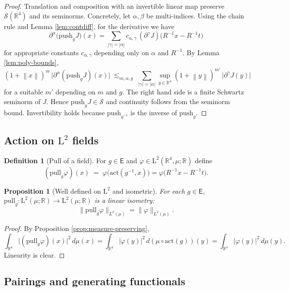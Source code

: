 \documentclass{article}
\newcommand{\R}{\mathbb{R}}
\newcommand{\Rd}{\mathbb{R}^4}
\newcommand{\norm}[1]{\left\lVert #1 \right\rVert}
\newcommand{\1}{\mathbbm{1}}
\newcommand{\Sch}{\mathscr{S}}
\newcommand{\LP}{\mathrm{L}}
\newcommand{\push}{\mathrm{push}}
\newcommand{\pull}{\mathrm{pull}}
\theoremstyle{plain}
\newtheorem{prop}[theorem]{Proposition}
\theoremstyle{definition}
\newtheorem{definition}[theorem]{Definition}
\numberwithin{equation}{section}
\begin{document}
\begin{proof}
Translation and composition with an invertible linear map preserve $\Sch(\Rd)$ and its seminorms. Concretely, let $\alpha,\beta$ be multi-indices. Using the chain rule and Lemma \ref{lem:contdiff}, for the derivative we have
\[
\partial^\alpha\bigl(\push_g J\bigr)(x)
=\sum_{|\gamma|=|\alpha|} c_{\alpha,\gamma} \, (\partial^\gamma J)\bigl(R^{-1}x-R^{-1}t\bigr)
\]
for appropriate constants $c_{\alpha,\gamma}$ depending only on $\alpha$ and $R^{-1}$. By Lemma \ref{lem:poly-bounds},
\[
(1+\norm{x})^m\,\bigl|\partial^\alpha(\push_g J)(x)\bigr|
\;\lesssim_{m,\alpha,g}\;
\sum_{|\gamma|=|\alpha|} \sup_{y\in\Rd} (1+\norm{y})^{m'}\,\bigl|\partial^\gamma J(y)\bigr|
\]
for a suitable $m'$ depending on $m$ and $g$. The right hand side is a finite Schwartz seminorm of $J$. Hence $\push_g J\in\Sch$ and continuity follows from the seminorm bound. Invertibility holds because $\push_{g^{-1}}$ is the inverse of $\push_g$.
\end{proof}

\subsection{Action on $\LP^2$ fields}

\begin{definition}[Pull of a field]\label{def:pull}
For $g\in\mathsf{E}$ and $\varphi\in \LP^2(\Rd,\mu;\R)$ define
\[
(\pull_g \varphi)(x)\;=\;\varphi\bigl(\mathrm{act}(g^{-1},x)\bigr)
=\varphi\bigl(R^{-1}x-R^{-1}t\bigr).
\]
\end{definition}

\begin{prop}[Well defined on $\LP^2$ and isometric]\label{prop:pull-L2}
For each $g\in\mathsf{E}$, $\pull_g:\LP^2(\mu;\R)\to\LP^2(\mu;\R)$ is a linear isometry:
\[
\|\pull_g \varphi\|_{L^2(\mu)}=\|\varphi\|_{L^2(\mu)}.
\]
\end{prop}

\begin{proof}
By Proposition \ref{prop:measure-preserving},
\[
\int_{\Rd} \bigl|(\pull_g\varphi)(x)\bigr|^2\, d\mu(x)
=\int_{\Rd} |\varphi(y)|^2\, d(\mu\circ \mathrm{act}(g)) (y)
=\int_{\Rd} |\varphi(y)|^2\, d\mu(y).
\]
Linearity is clear.
\end{proof}

\subsection{Pairings and generating functionals}
\end{document}
